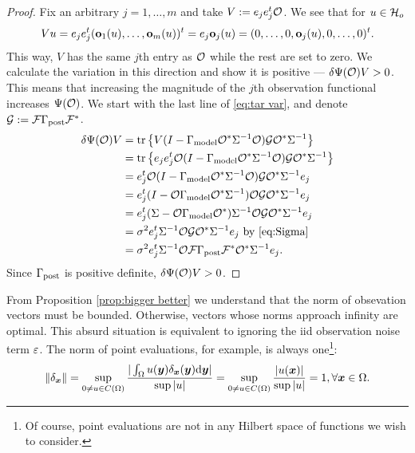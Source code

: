 \begin{proof} 
  Fix an arbitrary $j=1,\dots,m$ and take $V:= e_j e_j^t \mathcal{O}$. We see
  that for $u \in \mathcal{H}_o$
  \begin{equation*}
    Vu = e_je_j^t (\meas_1(u),\dots,\meas_m(u) )^t = e_j \meas_j(u)
    = (0,\dots,0,\meas_j(u),0,\dots,0)^t.
  \end{equation*}
  This way, $V$ has the same $j$th entry as $\mathcal{O}$ while the rest are
  set to zero. We calculate the variation in this direction and show
  it is positive --- $\delta \Psi(\mathcal{O})V > 0$. This means that
  increasing the magnitude of the $j$th observation functional
  increases $\Psi(\mathcal{O})$. We start with the last line of \eqref{eq:tar var}, and denote $\mathcal{G} : = \mathcal{F} \Gamma_{\textup{post}} \mathcal{F}^*$.
  \begin{align*}
     \delta \tar(\obs) V 
    &= \tr{V ( I - \modcov \obs^*\Sigma^{-1}\obs) \tmp \obs^* \Sigma^{-1}} \\
    &= \tr{e_je_j^t \obs ( I - \modcov \obs^*\Sigma^{-1}\obs) \tmp \obs^* \Sigma^{-1}} \\
    &= e_j^t \obs ( I - \modcov \obs^*\Sigma^{-1}\obs) \tmp \obs^* \Sigma^{-1}e_j \\
    &= e_j^t ( I - \obs \modcov \obs^*\Sigma^{-1})\obs \tmp \obs^* \Sigma^{-1}e_j \\  
    &=  e_j^t(\Sigma-\obs \modcov \obs^*) \Sigma^{-1}\obs \tmp \obs^* \Sigma^{-1}e_j \\
    &=\sigma^2 e_j^t \Sigma^{-1}\obs \tmp \obs^* \Sigma^{-1}e_j
    \text{ by \eqref{eq:Sigma} }\\
    &=\sigma^2 e_j^t \Sigma^{-1}\obs \fwd \postcov \fwd^* \obs^* \Sigma^{-1}e_j.
  \end{align*} 
  Since $\Gamma_{\textup{post}}$ is positive definite, $\delta \Psi(\mathcal{O}) V > 0$.
\end{proof}



From Proposition \ref{prop:bigger better} we understand that the norm
of obsevation vectors must be bounded. Otherwise, vectors whose norms
approach infinity are optimal. This absurd situation is equivalent to
ignoring the iid observation noise term $\varepsilon$. The norm of point
evaluations, for example, is always one\footnote{Of course, point
evaluations are not in any Hilbert space of functions we wish to
consider.}:
\begin{align*}
  \| \delta_{\x} \| = \sup_{0 \neq u \in C(\Omega)} \frac{
    |\int_{\Omega}u(\y) \delta_{\x}(\y) \der \y| 
  }{
    \sup|u|}
  = \sup_{0 \neq u \in C(\Omega)} \frac{|u(\x)|}{ \sup|u|} = 1,
  \forall \x \in \Omega.
\end{align*}

